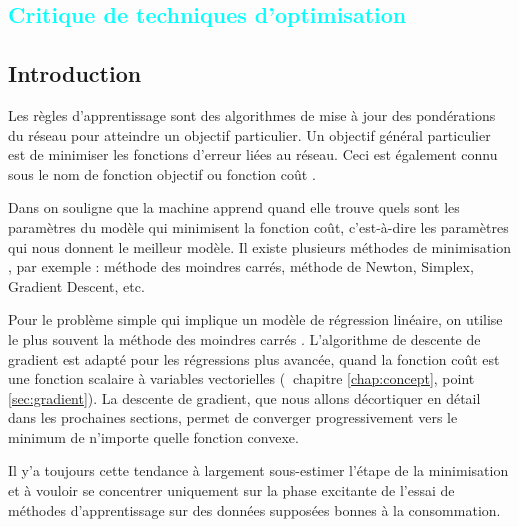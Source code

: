 			


%
%


\textcolor{cyan}{\chapter{Critique de techniques d'optimisation }\label{chap:methode}}	

	\section{Introduction}
	
		Les règles d'apprentissage sont des algorithmes de mise à jour des pondérations du réseau pour atteindre un objectif particulier. Un objectif général particulier est de minimiser les fonctions d'erreur liées au réseau. Ceci est également connu sous le nom de fonction objectif ou fonction coût \cite{ernst2014stochastic}. 
		
		
		Dans \cite{antoine2018apprentissage} on souligne que la machine apprend quand elle trouve quels sont les paramètres du modèle qui minimisent la fonction coût, c’est-à-dire les paramètres qui nous donnent le meilleur modèle. Il existe plusieurs méthodes de minimisation \cite{jtshiman:2021}, par exemple : méthode des moindres carrés, méthode de Newton, Simplex, Gradient Descent, etc. 
		
		Pour le problème simple qui implique un modèle de régression linéaire, on utilise le plus souvent la méthode des moindres carrés \cite{darlington2016regression, matloff2017statistical}. L’algorithme de descente de gradient est adapté pour les régressions plus avancée, quand la fonction coût est une fonction scalaire à variables vectorielles (\cf $ \ $ chapitre \ref{chap:concept}, point \ref{sec:gradient}). La descente de gradient, que nous allons décortiquer en détail dans les prochaines sections, permet de converger progressivement vers le minimum de n’importe quelle fonction convexe.
		
		Il y’a toujours cette tendance à largement sous-estimer l’étape de la minimisation et à vouloir se concentrer uniquement sur la phase excitante de l'essai de méthodes d'apprentissage sur des données supposées bonnes à la consommation.
		
